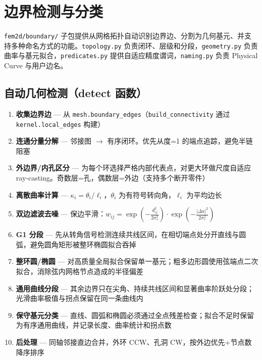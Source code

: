 \documentclass[12pt,a4paper]{ctexart}
\begin{document}
\section{边界检测与分类}

\texttt{fem2d/boundary/} 子包提供从网格拓扑自动识别边界边、分割为几何基元、并支持多种命名方式的功能。\texttt{topology.py} 负责闭环、层级和分段，\texttt{geometry.py} 负责曲率与基元拟合，\texttt{predicates.py} 提供自适应精度谓词，\texttt{naming.py} 负责 Physical Curve 与用户边名。

\subsection{自动几何检测（detect 函数）}

\begin{enumerate}[leftmargin=*]
  \item \textbf{收集边界边} — 从 \texttt{mesh.boundary\_edges}（\texttt{build\_connectivity} 通过 \texttt{kernel.local\_edges} 构建）
  \item \textbf{连通分量分解} — 邻接图 $\rightarrow$ 有序闭环。优先从度=1 的端点追踪，避免半链阻塞
  \item \textbf{外边界/内孔区分} — 为每个环选择严格内部代表点，对更大环做尺度自适应 ray-casting。奇数层=孔，偶数层=外边（支持多个断开零件）
  \item \textbf{离散曲率计算} — $\kappa_i = \theta_i / \ell_i$，$\theta_i$ 为有符号转向角，$\ell_i$ 为平均边长
  \item \textbf{双边滤波去噪} — 保边平滑：$w_{ij} = \exp(-\frac{d_{ij}^2}{2\sigma_s^2})\cdot\exp(-\frac{|\Delta\kappa|^2}{2\sigma_r^2})$
  \item \textbf{G1 分段} — 先从转角信号检测连续共线区间，在相切端点处分开直线与圆弧，避免圆角矩形被整环椭圆拟合吞掉
  \item \textbf{整环圆/椭圆} — 对高质量全局拟合保留单一基元；粗多边形圆使用弦端点二次拟合，消除弦内网格节点造成的半径偏差
  \item \textbf{通用曲线分段} — 其余边界只在尖角、持续共线区间和显著曲率阶跃处分段；光滑曲率极值与拐点保留在同一条曲线内
  \item \textbf{保守基元分类} — 直线、圆弧和椭圆必须通过全点残差检查；拟合不足时保留为有序通用曲线，并记录长度、曲率统计和拐点数
  \item \textbf{后处理} — 同轴邻接直边合并，外环 CCW、孔洞 CW，按外边优先+节点数降序排序
\end{enumerate}
\end{document}
